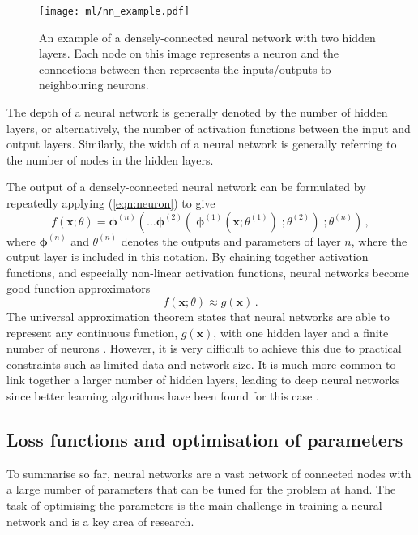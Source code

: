 \documentclass[main.tex]{subfiles}
\begin{document}
    \begin{figure}
        \texttt{[image: ml/nn\_example.pdf]}
        \caption{An example of a densely-connected
        neural network with two hidden layers.
        Each node on this image represents
        a neuron and the connections between then
        represents the inputs/outputs to neighbouring neurons.}
        \label{fig:nn_example}
    \end{figure}

    The depth of a neural network
    is generally denoted by the number of hidden layers,
    or alternatively, the number of activation functions
    between the input and output layers. Similarly,
    the width of a neural network is generally referring
    to the number of nodes in the hidden layers.

    The output of a densely-connected neural network can
    be formulated by repeatedly applying (\ref{eqn:neuron})
    to give
    \begin{equation}\label{eqn:nn_output}
        f(\mathbf{x}; \theta) = \boldsymbol{\phi}^{(n)}(\ldots \boldsymbol{\phi}^{(2)}(\; \boldsymbol{\phi}^{(1)}(\mathbf{x}; \theta^{(1)})\; ; \theta^{(2)}) \; ; \theta^{(n)}) \, ,
    \end{equation}
    where $\boldsymbol{\phi}^{(n)}$ and $\theta^{(n)}$
    denotes the outputs and parameters of layer $n$,
    where the output layer is included in this notation.
    By chaining together activation functions, and especially
    non-linear activation functions, neural networks
    become good function approximators
    \begin{equation}\label{eqn:nn_approx}
        f(\mathbf{x}; \theta) \approx g(\mathbf{x}) \, .
    \end{equation}
    The universal approximation theorem states that neural networks are
    able to represent any continuous function, $g(\mathbf{x})$,
    with one hidden layer and a finite number of neurons \cite{HORNIK1991251}.
    However, it is very difficult to achieve this due to
    practical constraints such as limited data and network size.
    It is much more common to link
    together a larger number of hidden layers, leading
    to deep neural networks since better learning algorithms
    have been found for this case \cite{lu2017expressive}.
    
\subsection{Loss functions and optimisation of parameters}
    To summarise so far, neural networks are a vast network
    of connected nodes with a large number of parameters that
    can be tuned for the problem at hand.
    The task of optimising the parameters is the main challenge
    in training a neural network and is a key area of research.
\end{document}
